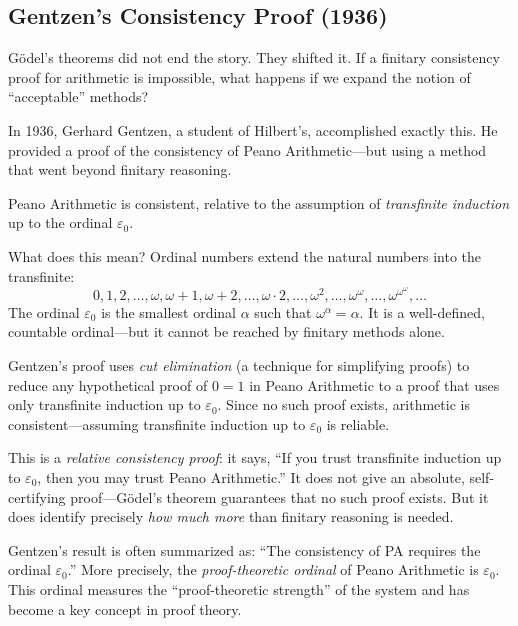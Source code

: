 \subsection{Gentzen's Consistency Proof (1936)}

G\"odel's theorems did not end the story. They shifted it. If a finitary consistency proof for arithmetic is impossible, what happens if we expand the notion of ``acceptable'' methods?

In 1936, Gerhard Gentzen, a student of Hilbert's, accomplished exactly this. He provided a proof of the consistency of Peano Arithmetic---but using a method that went beyond finitary reasoning.

\begin{proposition}[Gentzen, 1936]
\label{prop:gentzen}
Peano Arithmetic is consistent, relative to the assumption of \emph{transfinite induction} up to the ordinal $\varepsilon_0$.
\end{proposition}

What does this mean? Ordinal numbers extend the natural numbers into the transfinite:
\[
    0, 1, 2, \ldots, \omega, \omega+1, \omega+2, \ldots, \omega \cdot 2, \ldots, \omega^2, \ldots, \omega^\omega, \ldots, \omega^{\omega^\omega}, \ldots
\]
The ordinal $\varepsilon_0$ is the smallest ordinal $\alpha$ such that $\omega^\alpha = \alpha$. It is a well-defined, countable ordinal---but it cannot be reached by finitary methods alone.

Gentzen's proof uses \emph{cut elimination} (a technique for simplifying proofs) to reduce any hypothetical proof of $0 = 1$ in Peano Arithmetic to a proof that uses only transfinite induction up to $\varepsilon_0$. Since no such proof exists, arithmetic is consistent---assuming transfinite induction up to $\varepsilon_0$ is reliable.

This is a \emph{relative consistency proof}: it says, ``If you trust transfinite induction up to $\varepsilon_0$, then you may trust Peano Arithmetic.'' It does not give an absolute, self-certifying proof---G\"odel's theorem guarantees that no such proof exists. But it does identify precisely \emph{how much more} than finitary reasoning is needed.

\begin{remark}
Gentzen's result is often summarized as: ``The consistency of PA requires the ordinal $\varepsilon_0$.'' More precisely, the \emph{proof-theoretic ordinal} of Peano Arithmetic is $\varepsilon_0$. This ordinal measures the ``proof-theoretic strength'' of the system and has become a key concept in proof theory.
\end{remark}

